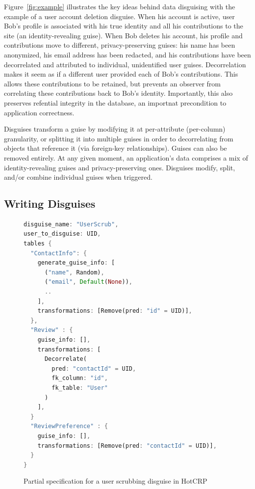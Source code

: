 %
%
%
%
Figure~\ref{fig:example} illustrates the key ideas behind data disguising with the example of a user
account deletion disguise.
%
When his account is active, user Bob's profile is associated with his true identity and all his
contributions to the site (an identity-revealing guise).
%
When Bob deletes his account, his profile and contributions move to different, privacy-preserving
guises: his name has been anonymized, his email address has been redacted, and his contributions
have been decorrelated and attributed to individual, unidentified user guises.
%
Decorrelation makes it seem as if a different user provided each of Bob's contributions.
%
This allows these contributions to be retained, but prevents an observer from correlating these
contributions back to Bob's identity.
%
Importantly, this also preserves refential integrity in the database, an importnat precondition
to application correctness.
%

%
Disguises transform a guise by modifying it at per-attribute (\ie per-column) granularity, or
splitting it into multiple guises in order to decorrelating from objects that reference it (via \eg foreign-key relationships).
%
Guises can also be removed entirely.
%
At any given moment, an application's data comprises a mix of identity-revealing guises
and privacy-preserving ones. Disguises modify, split, and/or combine individual guises when triggered.


\subsection{Writing Disguises}
\label{sec:disguises}

\begin{figure}[t!]
    \centering
    \footnotesize
\begin{lstlisting}[language=Rust]
disguise_name: "UserScrub",
user_to_disguise: UID,
tables {
  "ContactInfo": {
    generate_guise_info: [
      ("name", Random),
      ("email", Default(None)),
      ..
    ],
    transformations: [Remove(pred: "id" = UID)],
  },
  "Review" : {
    guise_info: [], 
    transformations: [
      Decorrelate(
        pred: "contactId" = UID,
        fk_column: "id",
        fk_table: "User"
      )
    ],
  }
  "ReviewPreference" : {
    guise_info: [], 
    transformations: [Remove(pred: "contactId" = UID)],
  }
}
\end{lstlisting}
    \caption{Partial specification for a user scrubbing disguise in HotCRP}
    \label{fig:spec}
\end{figure}


